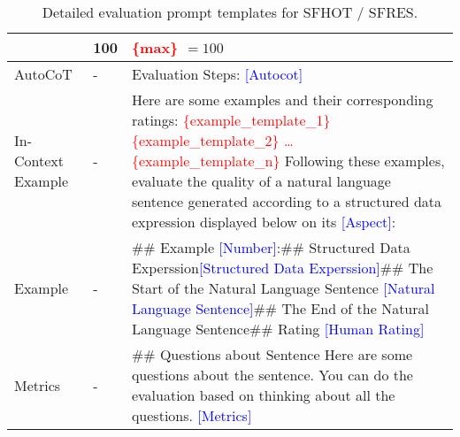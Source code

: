 \begin{table*} [t]
{\begin{tabular}{l l >{\raggedright\arraybackslash}m{}}
\cmidrule{2-3}
 & 100 & \textcolor{red}{\{max\}} $ = 100 $ \\
\midrule
\multirow{1}{*}{AutoCoT} & - & Evaluation Steps: \newline
\textcolor{blue}{[Autocot]} \\
\midrule
\multirow{1}{*}{In-Context Example} & - & Here are some examples and their corresponding ratings: \newline
\textcolor{red}{\{example\_template\_1\}} \newline
\textcolor{red}{\{example\_template\_2\}} \newline
\textcolor{red}{…} \newline
\textcolor{red}{\{example\_template\_n\}}\newline\newline
Following these examples, evaluate the quality of a natural language sentence generated according to a structured data expression displayed below on its \textcolor{blue}{[Aspect]}: \\
\midrule
Example & - & \#\# Example \textcolor{blue}{[Number]}:\newline \#\# Structured Data Experssion\newline\textcolor{blue}{[Structured Data Experssion]}\newline\newline \#\# The Start of the Natural Language Sentence \newline\textcolor{blue}{[Natural Language Sentence]}\newline \#\# The End of the Natural Language Sentence\newline\newline \#\# Rating \newline \textcolor{blue}{[Human Rating]}\\
\midrule
\multirow{1}{*}{Metrics} & - & \#\# Questions about Sentence \newline
Here are some questions about the sentence. You can do the evaluation based on thinking about all the questions. \newline
\textcolor{blue}{[Metrics]} \\
\bottomrule
\end{tabular}
}
\vspace{-2mm}
\caption{Detailed evaluation prompt templates for SFHOT / SFRES. }
\label{tab:evaluation_prompt_sfhot}
\end{table*}